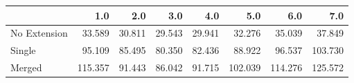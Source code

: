 \begin{tabular}{lrrrrrrr}
\toprule
{} &     1.0 &    2.0 &    3.0 &    4.0 &     5.0 &     6.0 &     7.0 \\
\midrule
No Extension &  33.589 & 30.811 & 29.543 & 29.941 &  32.276 &  35.039 &  37.849 \\
Single       &  95.109 & 85.495 & 80.350 & 82.436 &  88.922 &  96.537 & 103.730 \\
Merged       & 115.357 & 91.443 & 86.042 & 91.715 & 102.039 & 114.276 & 125.572 \\
\bottomrule
\end{tabular}

